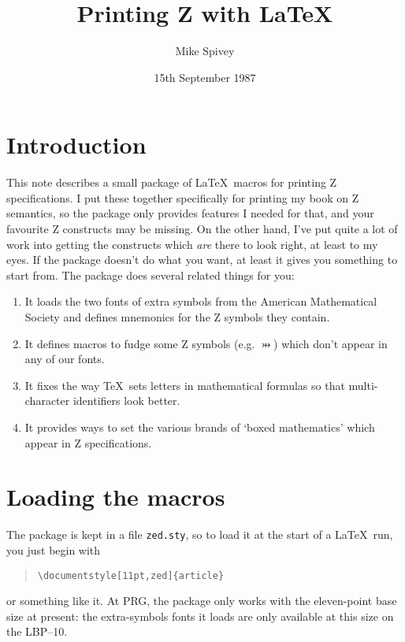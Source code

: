 
\title{Printing Z with \LaTeX}
\author{Mike Spivey}
\date{15th September 1987}
\maketitle

\section{Introduction}

This note describes a small package of \LaTeX\ macros for printing
Z specifications.
I put these together specifically for printing my book on Z semantics,
so the package only provides features I needed for that, and your
favourite Z constructs may be missing.
On the other hand, I've put quite a lot of work into getting
the constructs which {\em are\/} there to look right, at
least to my eyes. If the package doesn't do what you want,
at least it gives you something to start from.
The package does several related things for you:
\begin{enumerate}
\item   It loads the two fonts of extra symbols from the American
        Mathematical Society and defines mnemonics for the Z symbols
        they contain.
\item   It defines macros to fudge some Z symbols (e.g. $\pinj$) which
        don't appear in any of our fonts.
\item   It fixes the way \TeX\ sets letters in mathematical formulas so
        that multi-character identifiers look better.
\item   It provides ways to set the various brands of `boxed mathematics'
        which appear in Z specifications.
\end{enumerate}

\section{Loading the macros}

The package is kept in a file {\tt zed.sty}, so to load it at
the start of a \LaTeX\ run, you just begin with
\begin{quote}
\begin{verbatim}
\documentstyle[11pt,zed]{article}
\end{verbatim}
\end{quote}
or something like it.
At PRG, the package only works with the eleven-point base size at
present: the extra-symbols fonts it loads are only available at
this size on the LBP--10.

